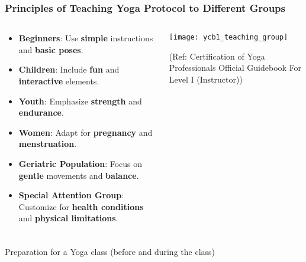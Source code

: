 \begin{frame}[fragile]\frametitle{Principles of Teaching Yoga Protocol to Different Groups}
\begin{columns}
    \begin{column}[T]{0.5\linewidth}
      \begin{itemize}
        \item \textbf{Beginners}: Use \textbf{simple} instructions and \textbf{basic poses}.
        \item \textbf{Children}: Include \textbf{fun} and \textbf{interactive} elements.
        \item \textbf{Youth}: Emphasize \textbf{strength} and \textbf{endurance}.
        \item \textbf{Women}: Adapt for \textbf{pregnancy} and \textbf{menstruation}.
        \item \textbf{Geriatric Population}: Focus on \textbf{gentle} movements and \textbf{balance}.
        \item \textbf{Special Attention Group}: Customize for \textbf{health conditions} and \textbf{physical limitations}.
      \end{itemize}
    \end{column}
    \begin{column}[T]{0.5\linewidth}
        \begin{center}
        \texttt{[image: ycb1\_teaching\_group]}
		
		{\tiny (Ref: Certification  of Yoga Professionals Official Guidebook For Level I (Instructor))}		
        \end{center}	
    \end{column}
\end{columns}
\end{frame}


\begin{frame}[fragile]\frametitle{}
\begin{center}
{\Large Preparation for a Yoga class (before and during the class)}
\end{center}
\end{frame}

